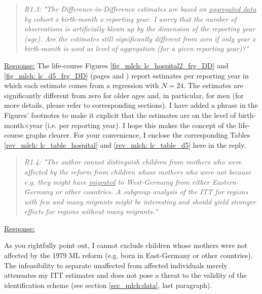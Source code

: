 \bigskip
{}
\begin{quote}
	\textit{R1.3: "The Difference-in-Difference estimates are based on \underline{aggregated data} by cohort x birth-month x reporting year. I worry that the number of observations is artificially blown up by the dimension of the reporting year (age). Are the estimates still significantly different from zero if only year x birth-month is used as level of aggregation (for a given reporting year)?"}
\end{quote}
\underline{Response:} The life-course Figures \ref{fig_mlch: lc_hospital2_frg_DD} and \ref{fig_mlch: lc_d5_frg_DD} (pages \pageref{fig_mlch: lc_hospital2_frg_DD} and \pageref{fig_mlch: lc_d5_frg_DD}) report estimates per reporting year in which each estimate comes from a regression with $N=24$. The estimates are significantly different from zero for older ages and, in particular, for men (for more details, please refer to corresponding sections). I have added a phrase in the Figures' footnotes to make it explicit that the estimates are on the level of birth-month$\times$year (i.e. per reporting year). I hope this makes the concept of the life-course graphs clearer. For your convenience, I enclose the corresponding Tables \ref{rev_mlch: lc_table_hospital} and \ref{rev_mlch: lc_table_d5} here in the reply.

\bigskip\bigskip





\bigskip
{}
\begin{quote}
	\textit{R1.4: "The author cannot distinguish children from mothers who were affected by the reform from children whose mothers who were not because e.g. they might have \underline{migrated} to West-Germany from either Eastern-Germany or other countries. A subgroup analysis of the ITT for regions with few and many migrants might be interesting and should yield stronger effects for regions without many migrants."}
\end{quote}
\underline{Response:}

As you rightfully point out, I cannot exclude children whose mothers were not affected by the 1979 ML reform (e.g. born in East-Germany or other countries). The infeasibility to separate unaffected from affected individuals merely attenuates my ITT estimates and does not pose a threat to the validity of the identification scheme (see section \ref{sec_mlch:data}, last paragraph).



